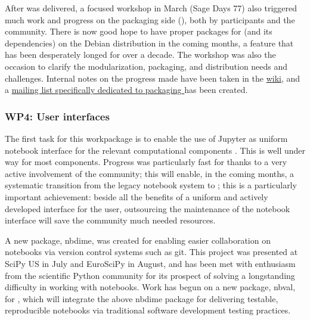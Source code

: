 \documentclass{deliverablereport}
\begin{document}
After  was delivered, a focused workshop
 in March (Sage Days 77) also triggered much work
and progress on the packaging side
(), both by \ODK
participants and the community. There is now good hope to have proper
packages for \Sage (and its dependencies) on the Debian
distribution in the coming months, a feature that has been desperately
longed for over a decade.  The workshop was also the occasion to
clarify the modularization, packaging, and distribution needs and
challenges. Internal notes on the progress made have been taken in the
\href{https://wiki.sagemath.org/days77/packaging}{\Sage wiki}, and a
\href{https://groups.google.com/forum/#!forum/sage-packaging}{mailing
  list specifically dedicated to packaging \Sage} has been created.

\subsubsection{WP4: User interfaces}

The first task for this workpackage is to enable the use of Jupyter as
uniform notebook interface for the relevant computational components
. This is well under way for most
components. Progress was particularly fast for \Sage thanks to a
very active involvement of the community; this will enable, in the
coming months, a systematic transition from the legacy \Sage
notebook system to \Jupyter; this is a particularly important
achievement: beside all the benefits of a uniform and actively
developed interface for the user, outsourcing the maintenance of the
notebook interface will save the \Sage community much needed
resources.

A new \Jupyter package, nbdime, was created for 
enabling easier collaboration on notebooks via version control systems such as git.
This project was presented at SciPy US in July and EuroSciPy in August,
and has been met with enthusiasm from the scientific Python community
for its prospect of solving a longstanding difficulty in working with notebooks.
Work has begun on a new package, nbval, for ,
which will integrate the above nbdime package for delivering testable,
reproducible notebooks via traditional software development testing practices.
\end{document}
